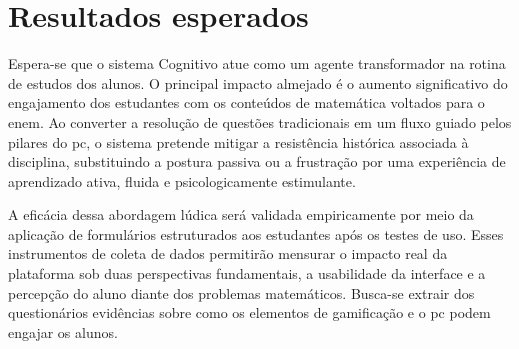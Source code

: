 
\chapter{Resultados esperados}
\label{ch:resultados}

Espera-se que o sistema Cognitivo atue como um agente transformador na rotina de
estudos dos alunos. O principal impacto almejado é o aumento significativo do
engajamento dos estudantes com os conteúdos de matemática voltados para o \gls{enem}.
Ao converter a resolução de questões tradicionais em um fluxo guiado pelos
pilares do \gls{pc}, o sistema pretende mitigar a resistência histórica associada à
disciplina, substituindo a postura passiva ou a frustração por uma
experiência de aprendizado ativa, fluida e psicologicamente estimulante.

A eficácia dessa abordagem lúdica será validada empiricamente por meio da
aplicação de formulários estruturados aos estudantes após os testes de uso.
Esses instrumentos de coleta de dados permitirão mensurar o impacto real da
plataforma sob duas perspectivas fundamentais, a usabilidade da interface e a
percepção do aluno diante dos problemas matemáticos. Busca-se extrair dos
questionários evidências sobre como os elementos de gamificação e o \gls{pc} podem
engajar os alunos.
